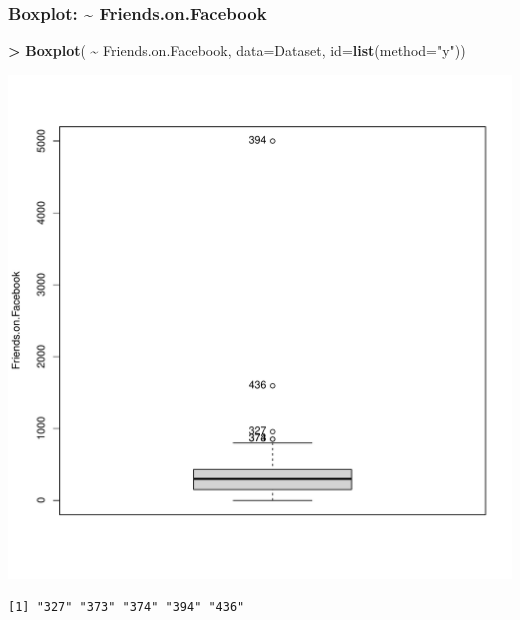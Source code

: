 \documentclass[
]{article}
\newenvironment{Shaded}{\begin{snugshade}}{\end{snugshade}}
\newcommand{\AttributeTok}[1]{\textcolor[rgb]{0.13,0.29,0.53}{#1}}
\newcommand{\FunctionTok}[1]{\textcolor[rgb]{0.13,0.29,0.53}{\textbf{#1}}}
\newcommand{\NormalTok}[1]{#1}
\newcommand{\SpecialCharTok}[1]{\textcolor[rgb]{0.81,0.36,0.00}{\textbf{#1}}}
\newcommand{\StringTok}[1]{\textcolor[rgb]{0.31,0.60,0.02}{#1}}
\begin{document}
\subsubsection{Boxplot: \textasciitilde{}
Friends.on.Facebook}\label{boxplot-friends.on.facebook}

\begin{Shaded}
\begin{Highlighting}[]
\SpecialCharTok{\textgreater{}} \FunctionTok{Boxplot}\NormalTok{( }\SpecialCharTok{\textasciitilde{}}\NormalTok{ Friends.on.Facebook, }\AttributeTok{data=}\NormalTok{Dataset, }\AttributeTok{id=}\FunctionTok{list}\NormalTok{(}\AttributeTok{method=}\StringTok{"y"}\NormalTok{))}
\end{Highlighting}
\end{Shaded}

\includegraphics[width=750px]{RcmdrMarkdown_files/figure-latex/unnamed-chunk-27-1}

\begin{verbatim}
[1] "327" "373" "374" "394" "436"
\end{verbatim}
\end{document}
